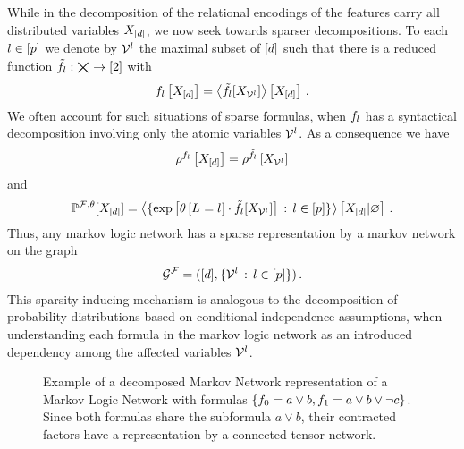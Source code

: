 While in the decomposition of  the relational encodings of the features carry all distributed variables $X_{[d]}$, we now seek towards sparser decompositions.
To each $l\in[p]$ we denote by $\mathcal{V}^{l}$ the maximal subset of $[d]$ such that there is a reduced function
$\tilde{f}_{l} : \bigtimes_{} \rightarrow [2]$
with
\begin{align*}
	f_{l}\left[X_{[d]}\right]
	= \left\langle \tilde{f}_{l}[X_{\mathcal{V}^{l}}]\right\rangle \left[ X_{[d]} \right] \, .
\end{align*}
We often account for such situations of sparse formulas, when $f_{l}$ has a syntactical decomposition involving only the atomic variables $\mathcal{V}^{l}$.
As a consequence we have
\begin{align*}
	\rho^{f_{l}}\left[X_{[d]}\right]
	= \rho^{\tilde{f}_{l}}\left[X_{\mathcal{V}^{l}}\right]
\end{align*}
and
\begin{align*}
	\mathbb{P}^{\mathcal{F},\theta}[X_{[d]}]
	= \left\langle \{\mathrm{exp}\left[\theta\left[L_{}=l_{}\right]\cdot\tilde{f}_{l}[X_{\mathcal{V}^{l}}]\right] \, : \, l\in[p]\}\right\rangle \left[ X_{[d]} | \varnothing \right] \, .
\end{align*}
Thus, any markov logic network has a sparse representation by a markov network on the graph
\begin{align*}
	\mathcal{G}^{\mathcal{F}} = ([d],\{\mathcal{V}^{l} \, : \, l\in[p]\}) \, .
\end{align*}
This sparsity inducing mechanism is analogous to the decomposition of probability distributions based on conditional independence assumptions, when understanding each formula in the markov logic network as an introduced dependency among the affected variables $\mathcal{V}^{l}$.


\begin{figure}[t]
\begin{center}
	
\end{center}
\caption{Example of a decomposed Markov Network representation of a Markov Logic Network with formulas $\{f_{0} = a\lor b, f_{1} = a \lor b \lor \lnot c\}$.
	Since both formulas share the subformula $a\lor b$, their contracted factors have a representation by a connected tensor network.}
\label{fig:mlnDecRep}
\end{figure}


